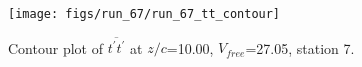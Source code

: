 \begin{figure}[H]
\centering
\texttt{[image: figs/run\_67/run\_67\_tt\_contour]}
\caption{Contour plot of $\overline{t^\prime t^\prime}$ at $z/c$=10.00, $V_{free}$=27.05, station 7.}
\end{figure}


